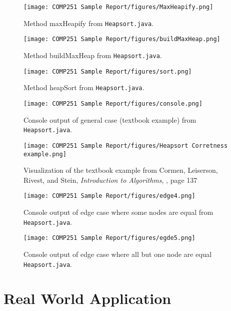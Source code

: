 \documentclass[12pt]{article}
\begin{document}
\clearpage

\begin{figure}[h]
  \centering
    \texttt{[image: COMP251 Sample Report/figures/MaxHeapify.png]}
    \caption{Method maxHeapify from \texttt{Heapsort.java}.}
\end{figure}

\begin{figure}[h]
  \centering
    \texttt{[image: COMP251 Sample Report/figures/buildMaxHeap.png]}
    \caption{Method buildMaxHeap from \texttt{Heapsort.java}.}
\end{figure}

\begin{figure}[h]
  \centering
    \texttt{[image: COMP251 Sample Report/figures/sort.png]}
    \caption{Method heapSort from \texttt{Heapsort.java}.}
\end{figure}


\begin{figure}[h]
    \centering
    \texttt{[image: COMP251 Sample Report/figures/console.png]}
    \caption{Console output of general case (textbook example) from \texttt{Heapsort.java}.}
\end{figure}
\begin{figure}[h]
    \centering
    \texttt{[image: COMP251 Sample Report/figures/Heapsort Corretness example.png]}
    \caption{Visualization of the textbook example from Cormen, Leiserson, Rivest, and Stein, \textit{Introduction to Algorithms}, \cite{cormen2009introduction}, page 137}
\end{figure}
\begin{figure}[h]
    \centering
    \texttt{[image: COMP251 Sample Report/figures/edge4.png]}
    \caption{Console output of edge case where some nodes are equal from \texttt{Heapsort.java}.}
\end{figure}

\begin{figure}[h]
    \centering
    \texttt{[image: COMP251 Sample Report/figures/egde5.png]}
    \caption{Console output of edge case where all but one node are equal \texttt{Heapsort.java}.}
\end{figure}



\clearpage
\section*{Real World Application}
\end{document}
